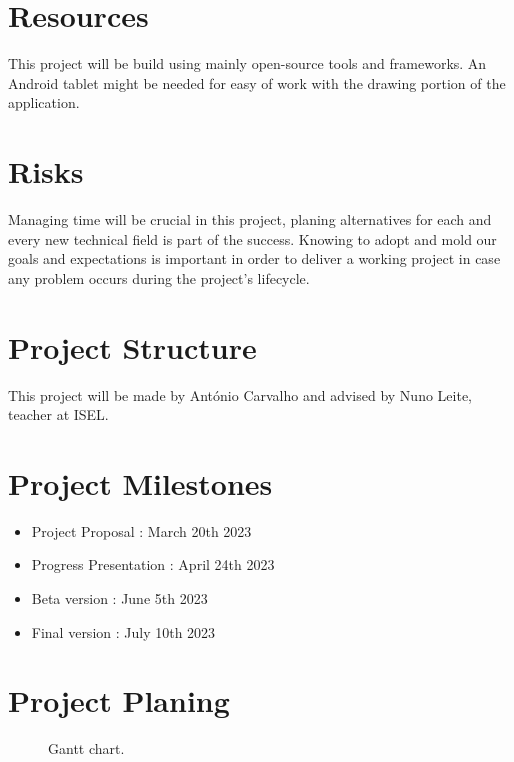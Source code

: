 \documentclass[11pt,a4paper]{article}
\begin{document}
\section{Resources}
	This project will be build using mainly open-source tools and frameworks. 
	An Android tablet might be needed for easy of work with the drawing portion of the application. 

\section{Risks}
	Managing time will be crucial in this project, planing alternatives for each and every new technical field is part of the success.
	Knowing to adopt and mold our goals and expectations is important in order to deliver a working project in case any problem occurs during the project's lifecycle. 
\section{Project Structure}
	This project will be made by António Carvalho and advised by Nuno Leite, teacher at ISEL. 
\section{Project Milestones}
	\begin{itemize}
		\item Project Proposal : March 20th 2023
		\item Progress Presentation : April 24th 2023
		\item Beta version : June 5th 2023
		\item Final version : July 10th 2023
	\end{itemize}



\section{Project Planing}
		\begin{figure}[htp]
		\centering
		\caption{Gantt chart.}
		\end{figure}

\vspace*{-10mm}

%

	
\end{document}
